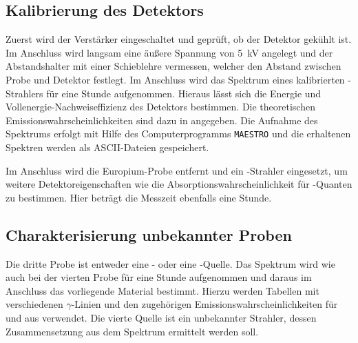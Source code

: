 \subsection{Kalibrierung des Detektors}
\label{sec:KalibrierungBeschreibung}

Zuerst wird der Verstärker eingeschaltet und geprüft, ob der Detektor gekühlt ist.
Im Anschluss wird langsam eine äußere Spannung von \SI{5}{\kilo\volt} angelegt
und der Abstandshalter mit einer Schieblehre vermessen,
welcher den Abstand zwischen Probe und Detektor festlegt.
Im Anschluss wird das Spektrum eines kalibrierten -Strahlers für eine Stunde aufgenommen.
Hieraus lässt sich die Energie und Vollenergie-Nachweiseffizienz
des Detektors bestimmen.
Die theoretischen Emissionswahrscheinlichkeiten sind dazu in \cite[28]{anleitung} angegeben.
Die Aufnahme des Spektrums erfolgt mit Hilfe des Computerprogramms
\texttt{MAESTRO} und die erhaltenen Spektren werden als ASCII-Dateien gespeichert.

Im Anschluss wird die Europium-Probe entfernt und ein -Strahler eingesetzt,
um weitere Detektoreigenschaften wie die Absorptionswahrscheinlichkeit für
-Quanten zu bestimmen.
Hier beträgt die Messzeit ebenfalls eine Stunde.

\subsection{Charakterisierung unbekannter Proben}
\label{sec:CharakterisierungBeschreibung}

Die dritte Probe ist entweder eine - oder eine -Quelle.
Das Spektrum wird wie auch bei der vierten Probe für eine Stunde aufgenommen
und daraus im Anschluss das vorliegende Material bestimmt.
Hierzu werden Tabellen mit verschiedenen $\gamma$-Linien und den zugehörigen
Emissionswahrscheinlichkeiten für  und  aus \cite[28]{anleitung}
verwendet.
Die vierte Quelle ist ein unbekannter Strahler, dessen Zusammensetzung
aus dem Spektrum ermittelt werden soll.
